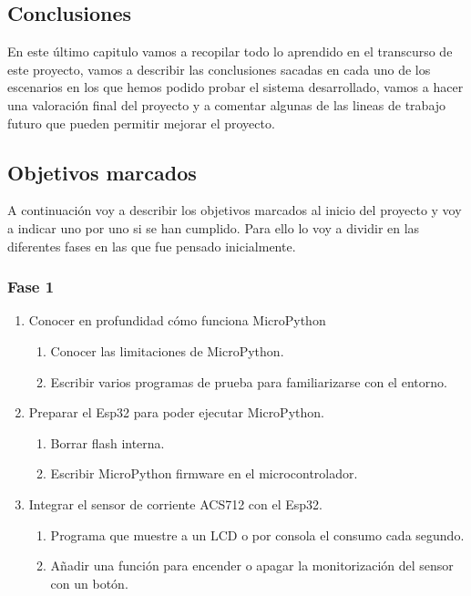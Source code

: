 \begin{titlepage}
\chapter{Conclusiones}
En este último capitulo vamos a recopilar todo lo aprendido en el transcurso de este proyecto, vamos a describir las conclusiones sacadas en cada uno de los escenarios en los que hemos podido probar el sistema desarrollado, vamos a hacer una valoración final del proyecto y a comentar algunas de las lineas de trabajo futuro que pueden permitir mejorar el proyecto.\\
\section{Objetivos marcados}
A continuación voy a describir los objetivos marcados al inicio del proyecto y voy a indicar uno por uno si se han cumplido. Para ello lo voy a dividir en las diferentes fases en las que fue pensado inicialmente.
\subsection{Fase 1}
\begin{enumerate}
    \item Conocer en profundidad cómo funciona MicroPython
    \begin{enumerate}
        \item Conocer las limitaciones de MicroPython. \checkmark
        \item Escribir varios programas de prueba para familiarizarse con el entorno. \checkmark
    \end{enumerate}
    \item Preparar el Esp32 para poder ejecutar MicroPython.
    \begin{enumerate}
        \item Borrar flash interna. \checkmark
        \item Escribir MicroPython firmware en el microcontrolador. \checkmark
    \end{enumerate}
    \item Integrar el sensor de corriente ACS712 con el Esp32. 
    \begin{enumerate}
        \item Programa que muestre a un LCD o por consola el consumo cada segundo. \checkmark
        \item Añadir una función para encender o apagar la monitorización del sensor con un botón.\checkmark
    \end{enumerate}
\end{enumerate}


\end{titlepage}
